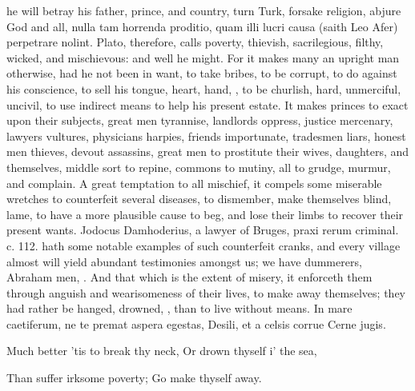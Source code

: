 {{he will betray his father, prince, and country, turn Turk, forsake
religion, abjure God and all, nulla tam horrenda proditio, quam illi
lucri causa (saith Leo Afer) perpetrare nolint. Plato,
therefore, calls poverty, thievish, sacrilegious, filthy, wicked, and
mischievous: and well he might. For it makes many an upright man
otherwise, had he not been in want, to take bribes, to be corrupt, to
do against his conscience, to sell his tongue, heart, hand, \etc{}, to be
churlish, hard, unmerciful, uncivil, to use indirect means to help his
present estate. It makes princes to exact upon their subjects, great
men tyrannise, landlords oppress, justice mercenary, lawyers vultures,
physicians harpies, friends importunate, tradesmen liars, honest men
thieves, devout assassins, great men to prostitute their wives,
daughters, and themselves, middle sort to repine, commons to mutiny,
all to grudge, murmur, and complain. A great temptation to all
mischief, it compels some miserable wretches to counterfeit several
diseases, to dismember, make themselves blind, lame, to have a more
plausible cause to beg, and lose their limbs to recover their present
wants. Jodocus Damhoderius, a lawyer of Bruges, praxi rerum criminal.
c. 112. hath some notable examples of such counterfeit cranks, and
every village almost will yield abundant testimonies amongst us; we
have dummerers, Abraham men, \etc{}. And that which is the extent of
misery, it enforceth them through anguish and wearisomeness of their
lives, to make away themselves; they had rather be hanged, drowned,
\etc{}, than to live without means.
In mare caetiferum, ne te premat aspera egestas,
Desili, et a celsis corrue Cerne jugis.


Much better 'tis to break thy neck,
Or drown thyself i' the sea,

Than suffer irksome poverty;
Go make thyself away.

}}
